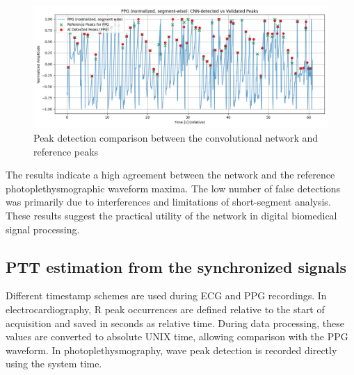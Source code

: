\documentclass[journal]{IEEEtran}
\begin{document}
\begin{figure}[htbp]
    \centering
    \includegraphics[scale=0.28]{ppg_ai_vs_real.png}
    \caption{Peak detection comparison between the convolutional network and reference peaks}
    \label{fig:ppg_ai_real_peaks}
\end{figure}

\newpage
The results indicate a high agreement between the network and the reference photoplethysmographic waveform maxima. The low number of false detections was primarily due to interferences and limitations of short-segment analysis. These results suggest the practical utility of the network in digital biomedical signal processing.


\subsection{PTT estimation from the synchronized signals}
Different timestamp schemes are used during ECG and PPG recordings. In electrocardiography, R peak occurrences are defined relative to the start of acquisition and saved in seconds as relative time. During data processing, these values are converted to absolute UNIX time, allowing comparison with the PPG waveform. In photoplethysmography, wave peak detection is recorded directly using the system time.
\end{document}
